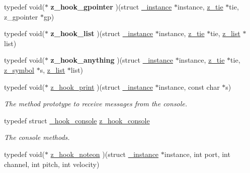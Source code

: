 \begin{DoxyCompactItemize}
\item 
\hypertarget{group__zpd_ga34202fe6380e49c22bc54f1f27615bdf}{typedef void($\ast$ {\bfseries z\-\_\-hook\-\_\-gpointer} )(struct \hyperlink{struct__instance}{\-\_\-instance} $\ast$instance, \hyperlink{group__zpd_ga36a59f7502bf6b62bab3e65cc08fe08d}{z\-\_\-tie} $\ast$tie, z\-\_\-gpointer $\ast$gp)}\label{group__zpd_ga34202fe6380e49c22bc54f1f27615bdf}

\item 
\hypertarget{group__zpd_gac5b2173ce223181a0d6e328381abb5ae}{typedef void($\ast$ {\bfseries z\-\_\-hook\-\_\-list} )(struct \hyperlink{struct__instance}{\-\_\-instance} $\ast$instance, \hyperlink{group__zpd_ga36a59f7502bf6b62bab3e65cc08fe08d}{z\-\_\-tie} $\ast$tie, \hyperlink{struct__list}{z\-\_\-list} $\ast$list)}\label{group__zpd_gac5b2173ce223181a0d6e328381abb5ae}

\item 
\hypertarget{group__zpd_gaa7e1fc18c54e6f0e39c1007550aff76d}{typedef void($\ast$ {\bfseries z\-\_\-hook\-\_\-anything} )(struct \hyperlink{struct__instance}{\-\_\-instance} $\ast$instance, \hyperlink{group__zpd_ga36a59f7502bf6b62bab3e65cc08fe08d}{z\-\_\-tie} $\ast$tie, \hyperlink{group__zpd_ga43e609e9bccc7a2018b8f16558b9494c}{z\-\_\-symbol} $\ast$s, \hyperlink{struct__list}{z\-\_\-list} $\ast$list)}\label{group__zpd_gaa7e1fc18c54e6f0e39c1007550aff76d}

\item 
\hypertarget{group__zpd_ga593812eca293daf504e9e6da49d00a52}{typedef void($\ast$ \hyperlink{group__zpd_ga593812eca293daf504e9e6da49d00a52}{z\-\_\-hook\-\_\-print} )(struct \hyperlink{struct__instance}{\-\_\-instance} $\ast$instance, const char $\ast$s)}\label{group__zpd_ga593812eca293daf504e9e6da49d00a52}

\begin{DoxyCompactList}\small\item\em The method prototype to receive messages from the console. \end{DoxyCompactList}\item 
\hypertarget{group__zpd_gab1e7283c4cbcb0f6576db1ac5238a112}{typedef struct \hyperlink{struct__hook__console}{\-\_\-hook\-\_\-console} \hyperlink{group__zpd_gab1e7283c4cbcb0f6576db1ac5238a112}{z\-\_\-hook\-\_\-console}}\label{group__zpd_gab1e7283c4cbcb0f6576db1ac5238a112}

\begin{DoxyCompactList}\small\item\em The console methods. \end{DoxyCompactList}\item 
\hypertarget{group__zpd_gabfddab8b692c37a479828e9e92661dac}{typedef void($\ast$ \hyperlink{group__zpd_gabfddab8b692c37a479828e9e92661dac}{z\-\_\-hook\-\_\-noteon} )(struct \hyperlink{struct__instance}{\-\_\-instance} $\ast$instance, int port, int channel, int pitch, int velocity)}\label{group__zpd_gabfddab8b692c37a479828e9e92661dac}


\end{DoxyCompactItemize}
